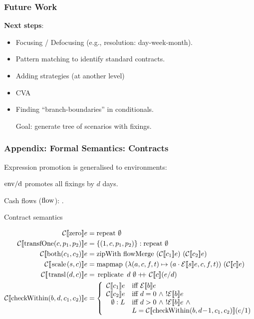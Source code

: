 \documentclass[xcolor=dvipsnames,11pt]{beamer}
\renewcommand{\emph}[1]{\textcolor{structure!90}{#1}}
\newcommand{\ttt}[1]{\mbox{\cd{#1}}}
\newcommand{\zero}{\ttt{zero}}
\newcommand{\transfOne}{\ttt{transfOne}}
\newcommand{\scale}{\ttt{scale}}
\newcommand{\transl}{\ttt{transl}}
\newcommand{\both}{\ttt{both}}
\newcommand{\checkWithin}{\ttt{checkWithin}}
\begin{document}
\begin{frame}
\frametitle{Future Work}

\textbf{Next steps}:
\begin{itemize}
  \item Focusing / Defocusing  (e.g., resolution: day-week-month).
  \item Pattern matching to identify standard contracts.
  \item Adding strategies (at another level)
  \item CVA
  \item Finding ``branch-boundaries'' in conditionals.

      \emph{Goal:} generate tree of scenarios with fixings.
\end{itemize}
\end{frame}

\begin{frame}
    \frametitle{Appendix: Formal Semantics: Contracts}

Expression promotion is generalised to environments: 
{\footnotesize
\begin{center}
$\ttt{env/d}$ promotes all fixings by $d$ days.
\end{center}}

Cash flows ($\ttt{flow}$): .

\vfill

Contract semantics \hfill \framebox{$ \mathcal{C} : \ttt{contr} \times \ttt{env} 
          \rightarrow \mathbb{P}(\ttt{flow})^\mathbb{N}$}

\vspace{-2ex}
{\footnotesize
\begin{align*}
\csem{\zero}{e}{\ttt{repeat}\ \emptyset}\\
\csem{\transfOne(c,p_1,p_2)}{e}{\{(1,c,p_1,p_2)\} : \ttt{repeat}\ \emptyset }\\
\csem{\both(c_1,c_2)}{e}{\ttt{zipWith flowMerge }\ (\mathcal{C}\sem{c_1}e)\ (\mathcal{C}\sem{c_2}e)}\\
\csem{\scale(s,c)}{e}{\ttt{mapmap}\ (\lambda (a,c,f,t)\mapsto(a\cdot\mathcal{E}\sem{s}e,c,f,t))\ (\mathcal{C}\sem{c}e)}\\
\csem{\transl(d,c)}{e}{\ttt{replicate}\ d \ \emptyset +\!\!\!+\  \mathcal{C}\sem{c}(e/d)}\\
\csem{\checkWithin(b,d,c_1,c_2)}{e}{
\left \{
\begin{array}{rl}
\mathcal{C}\sem{c_1}e & \mbox{iff}\ \mathcal{E}\sem{b}e \\
\mathcal{C}\sem{c_2}e & \mbox{iff}\ d = 0\ \wedge\ !\mathcal{E}\sem{b}e  \\
\emptyset : L & \mbox{iff}\ d > 0\ \wedge\ !\mathcal{E}\sem{b}e \ \wedge \\
& L = \mathcal{C}\sem{\checkWithin(b,d\!-\!1,c_1,c_2)}(e/1)
\end{array}\right.
}
\end{align*}
}

\end{frame}
\end{document}
